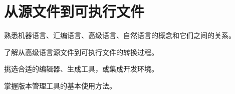 
\chapter{从源文件到可执行文件}

\begin{introduction}
	\item 熟悉机器语言、汇编语言、高级语言、自然语言的概念和它们之间的关系。
	\item 了解从高级语言源文件到可执行文件的转换过程。
	\item 挑选合适的编辑器、生成工具，或集成开发环境。
	\item 掌握版本管理工具的基本使用方法。
\end{introduction}
